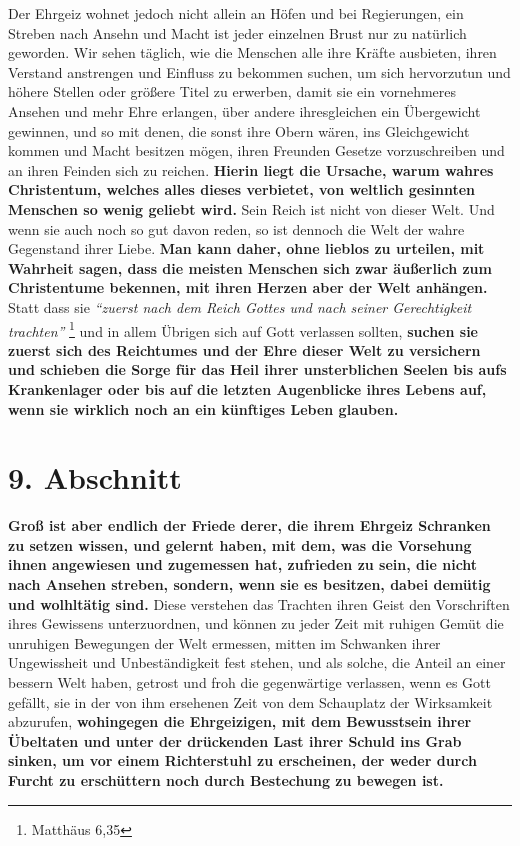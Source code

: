 Der Ehrgeiz wohnet jedoch nicht allein an Höfen und bei Regierungen, ein Streben
nach Ansehn und Macht ist jeder einzelnen Brust nur zu natürlich geworden. Wir
sehen täglich, wie die Menschen alle ihre Kräfte ausbieten, ihren Verstand
anstrengen und Einfluss zu bekommen suchen, um sich hervorzutun und höhere
Stellen oder größere Titel zu erwerben, damit sie ein vornehmeres Ansehen und
mehr Ehre erlangen, über andere ihresgleichen ein Übergewicht gewinnen, und so
mit denen, die sonst ihre Obern wären, ins Gleichgewicht kommen und Macht
besitzen mögen, ihren Freunden Gesetze vorzuschreiben und an ihren Feinden sich
zu reichen.
\textbf{Hierin liegt die Ursache, warum wahres Christentum, welches alles
dieses verbietet, von weltlich gesinnten Menschen so wenig geliebt wird.} Sein
Reich ist nicht von dieser Welt. Und wenn sie auch noch so gut davon reden, so
ist dennoch die Welt der wahre Gegenstand ihrer Liebe. \textbf{Man kann daher, ohne
lieblos zu urteilen, mit Wahrheit sagen, dass die meisten Menschen sich zwar
äußerlich zum Christentume bekennen, mit ihren Herzen aber der Welt anhängen.}
Statt dass sie
\textit{"`zuerst nach dem Reich Gottes und nach seiner Gerechtigkeit
trachten"'}
\footnote{Matthäus 6,35}
und in allem Übrigen sich auf Gott verlassen
sollten, \textbf{suchen sie zuerst sich des Reichtumes und der Ehre dieser Welt zu
versichern und schieben die Sorge für das Heil ihrer unsterblichen Seelen bis
aufs Krankenlager oder bis auf die letzten Augenblicke ihres Lebens auf, wenn
sie wirklich noch an ein künftiges Leben glauben.}

\section{9. Abschnitt} \label{kap8_ab9}

\textbf{Groß ist aber endlich der Friede derer, die ihrem Ehrgeiz Schranken zu setzen
wissen, und gelernt haben, mit dem, was die Vorsehung ihnen angewiesen und
zugemessen hat, zufrieden zu sein, die nicht nach Ansehen streben, sondern, wenn
sie es besitzen, dabei demütig und wolhltätig sind.} Diese verstehen das
Trachten ihren Geist den Vorschriften ihres Gewissens unterzuordnen, und
können zu jeder Zeit mit ruhigen Gemüt die unruhigen Bewegungen der Welt
ermessen, mitten im Schwanken ihrer Ungewissheit und Unbeständigkeit fest stehen,
und als solche, die Anteil an einer bessern Welt haben, getrost und froh die
gegenwärtige verlassen, wenn es Gott gefällt, sie in der von ihm ersehenen Zeit
von dem Schauplatz der Wirksamkeit abzurufen, \textbf{wohingegen die Ehrgeizigen, mit
dem Bewusstsein ihrer Übeltaten und unter der drückenden Last ihrer Schuld ins
Grab sinken, um vor einem Richterstuhl  zu erscheinen, der weder durch Furcht zu
erschüttern noch durch Bestechung zu bewegen ist.}

